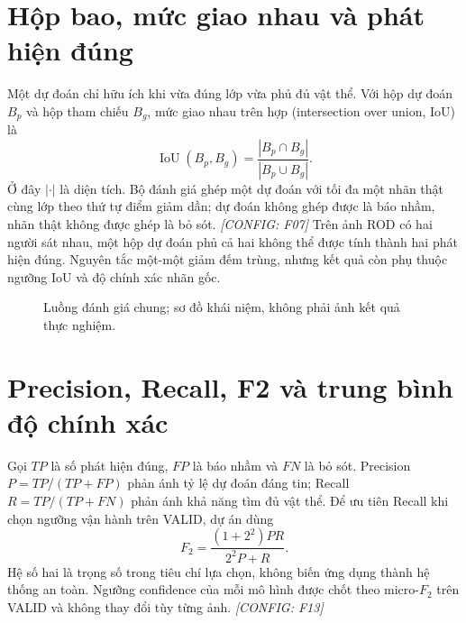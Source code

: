\documentclass[12pt,a4paper,oneside]{report}
\newcommand{\configured}[1]{\textit{[CONFIG: #1]}}
\begin{document}
\section{Hộp bao, mức giao nhau và phát hiện đúng}
Một dự đoán chỉ hữu ích khi vừa đúng lớp vừa phủ đủ vật thể. Với hộp dự đoán $B_p$ và hộp tham chiếu $B_g$, mức giao nhau trên hợp (intersection over union, IoU) là
\begin{equation}\operatorname{IoU}(B_p,B_g)=\frac{|B_p\cap B_g|}{|B_p\cup B_g|}.\end{equation}
Ở đây $|\cdot|$ là diện tích. Bộ đánh giá ghép một dự đoán với tối đa một nhãn thật cùng lớp theo thứ tự điểm giảm dần; dự đoán không ghép được là báo nhầm, nhãn thật không được ghép là bỏ sót. \configured{F07} Trên ảnh ROD có hai người sát nhau, một hộp dự đoán phủ cả hai không thể được tính thành hai phát hiện đúng. Nguyên tắc một-một giảm đếm trùng, nhưng kết quả còn phụ thuộc ngưỡng IoU và độ chính xác nhãn gốc.

\begin{figure}[htbp]\centering
{}
\caption{Luồng đánh giá chung; sơ đồ khái niệm, không phải ảnh kết quả thực nghiệm.}\end{figure}

\section{Precision, Recall, F2 và trung bình độ chính xác}
Gọi $TP$ là số phát hiện đúng, $FP$ là báo nhầm và $FN$ là bỏ sót. Precision $P=TP/(TP+FP)$ phản ánh tỷ lệ dự đoán đáng tin; Recall $R=TP/(TP+FN)$ phản ánh khả năng tìm đủ vật thể. Để ưu tiên Recall khi chọn ngưỡng vận hành trên VALID, dự án dùng
\begin{equation}F_2=\frac{(1+2^2)PR}{2^2P+R}.\end{equation}
Hệ số hai là trọng số trong tiêu chí lựa chọn, không biến ứng dụng thành hệ thống an toàn. Ngưỡng confidence của mỗi mô hình được chốt theo micro-$F_2$ trên VALID và không thay đổi tùy từng ảnh. \configured{F13}
\end{document}

